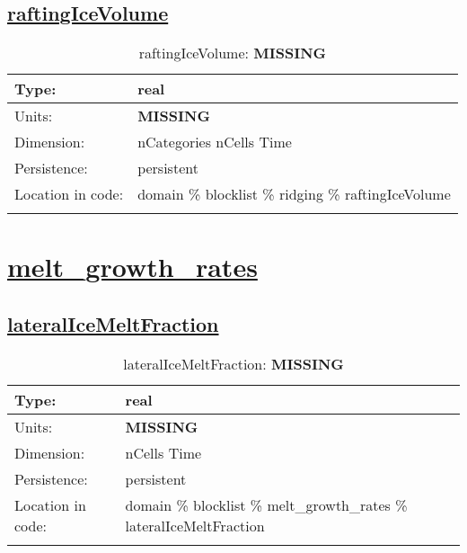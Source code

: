 \subsection[raftingIceVolume]{\hyperref[sec:var_tab_ridging]{raftingIceVolume}}
\label{subsec:var_sec_ridging_raftingIceVolume}
\begin{center}
\begin{longtable}{| p{2.0in} | p{4.0in} |}
        \hline 
        Type: & real \\
        \hline 
        Units: & {\bf \color{red} MISSING} \\
        \hline 
        Dimension: & nCategories nCells Time \\
        \hline 
        Persistence: & persistent \\
        \hline 
         Location in code: & domain \% blocklist \% ridging \% raftingIceVolume \\
         \hline 
    \caption{raftingIceVolume: {\bf \color{red} MISSING}}
\end{longtable}
\end{center}
\section[melt\_growth\_rates]{\hyperref[sec:var_tab_melt_growth_rates]{melt\_growth\_rates}}
\label{sec:var_sec_melt_growth_rates}
\subsection[lateralIceMeltFraction]{\hyperref[sec:var_tab_melt_growth_rates]{lateralIceMeltFraction}}
\label{subsec:var_sec_melt_growth_rates_lateralIceMeltFraction}
\begin{center}
\begin{longtable}{| p{2.0in} | p{4.0in} |}
        \hline 
        Type: & real \\
        \hline 
        Units: & {\bf \color{red} MISSING} \\
        \hline 
        Dimension: & nCells Time \\
        \hline 
        Persistence: & persistent \\
        \hline 
         Location in code: & domain \% blocklist \% melt\_growth\_rates \% lateralIceMeltFraction \\
         \hline 
    \caption{lateralIceMeltFraction: {\bf \color{red} MISSING}}
\end{longtable}
\end{center}
